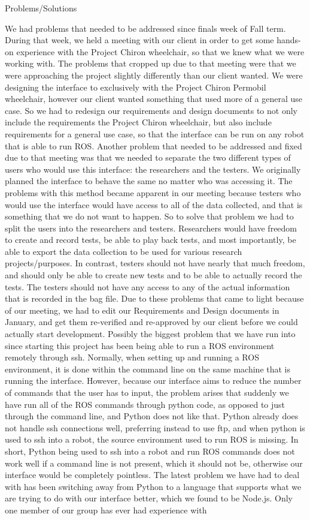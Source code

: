 \documentclass[onecolumn, draftclsnofoot,10pt, compsoc]{IEEEtran}
\begin{document}
Problems/Solutions

We had problems that needed to be addressed since finals week of Fall term. During that week, we held a meeting with our client in order to get some hands-on experience with the Project Chiron wheelchair, so that we knew what we were working with. The problems that cropped up due to that meeting were that we were approaching the project slightly differently than our client wanted. We were designing the interface to exclusively with the Project Chiron Permobil wheelchair, however our client wanted something that used more of a general use case. So we had to redesign our requirements and design documents to not only include the requirements the Project Chiron wheelchair, but also include requirements for a general use case, so that the interface can be run on any robot that is able to run ROS. Another problem that needed to be addressed and fixed due to that meeting was that we needed to separate the two different types of users who would use this interface: the researchers and the testers. We originally planned the interface to behave the same no matter who was accessing it. The problems with this method became apparent in our meeting because testers who would use the interface would have access to all of the data collected, and that is something that we do not want to happen. So to solve that problem we had to split the users into the researchers and testers. Researchers would have freedom to create and record tests, be able to play back tests, and most importantly, be able to export the data collection to be used for various research projects/purposes. In contrast, testers should not have nearly that much freedom, and should only be able to create new tests and to be able to actually record the tests. The testers should not have any access to any of the actual information that is recorded in the bag file. Due to these problems that came to light because of our meeting, we had to edit our Requirements and Design documents in January, and get them re-verified and re-approved by our client before we could actually start development. Possibly the biggest problem that we have run into since starting this project has been being able to run a ROS environment remotely through ssh. Normally, when setting up and running a ROS environment, it is done within the command line on the same machine that is running the interface. However, because our interface aims to reduce the number of commands that the user has to input, the problem arises that suddenly we have run all of the ROS commands through python code, as opposed to just through the command line, and Python does not like that. Python already does not handle ssh connections well, preferring instead to use ftp, and when python is used to ssh into a robot, the source environment used to run ROS is missing. In short, Python being used to ssh into a robot and run ROS commands does not work well if a command line is not present, which it should not be, otherwise our interface would be completely pointless. The latest problem we have had to deal with has been switching away from Python to a language that supports what we are trying to do with our interface better, which we found to be Node.js. Only one member of our group has ever had experience with 
\end{document}
